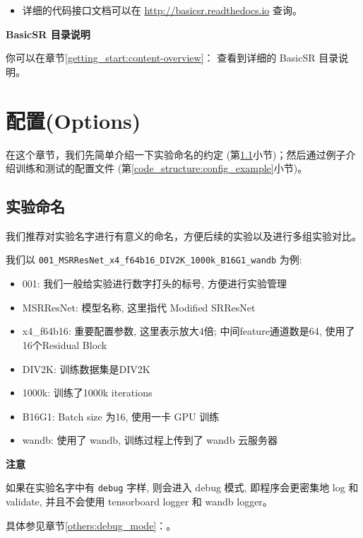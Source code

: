\documentclass[../main.tex]{subfiles}
\begin{document}
\begin{itemize}
    \item 详细的代码接口文档可以在 \url{http://basicsr.readthedocs.io} 查询。
\end{itemize}

\begin{note} %
    \textbf{BasicSR 目录说明}

    你可以在章节\ref{getting_start:content-overview}： 查看到详细的 BasicSR 目录说明。
\end{note}


\section{配置(Options)}\label{code_structure:config}

在这个章节，我们先简单介绍一下实验命名的约定 (第\ref{code_structure:name_convention}小节)；然后通过例子介绍训练和测试的配置文件 (第\ref{code_structure:config_example}小节)。

\subsection{实验命名}\label{code_structure:name_convention}

我们推荐对实验名字进行有意义的命名，方便后续的实验以及进行多组实验对比。

我们以 \texttt{001\_MSRResNet\_x4\_f64b16\_DIV2K\_1000k\_B16G1\_wandb} 为例:

\begin{itemize}
\item 001: 我们一般给实验进行数字打头的标号, 方便进行实验管理
\item MSRResNet: 模型名称, 这里指代 Modified SRResNet
\item x4\_f64b16: 重要配置参数, 这里表示放大4倍; 中间feature通道数是64, 使用了16个Residual Block
\item DIV2K: 训练数据集是DIV2K
\item 1000k: 训练了1000k iterations
\item B16G1: Batch size 为16, 使用一卡 GPU 训练
\item wandb: 使用了 wandb, 训练过程上传到了 wandb 云服务器
\end{itemize}

\begin{hl} %
    \textbf{注意}

    如果在实验名字中有 \texttt{debug} 字样, 则会进入 debug 模式, 即程序会更密集地 log 和 validate, 并且不会使用 tensorboard logger 和 wandb logger。

    具体参见章节\ref{others:debug_mode}：。
\end{hl}
\end{document}
